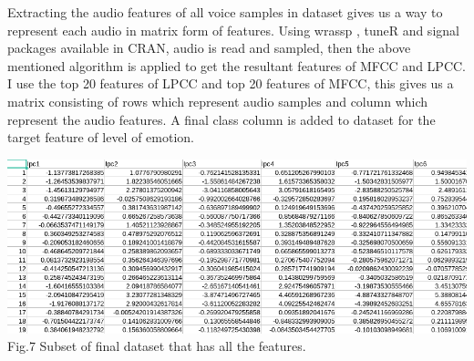 \documentclass[11pt,a4paper]{article}
\begin{document}
Extracting the audio features of all voice samples in dataset gives us a way to represent each audio in matrix form of features. Using wrassp \cite{wrassp_r} , tuneR  \cite{tune_r}  and signal \cite{singal} packages available in CRAN, audio is read and sampled, then the above mentioned algorithm is applied to get the resultant features of MFCC and LPCC. I use the top 20 features of LPCC and top 20 features of MFCC, this gives us a matrix consisting of rows which represent audio samples and column which represent the audio features. A final class column is added to dataset for the target feature of level of emotion.

    \begin{center}
	
	\includegraphics[scale=0.35]{LPC_MFCC_SUBSET_DATASET.png} \\ 
	Fig.7 Subset of final dataset that has all the features. \\
	
\end{center} 
\end{document}
